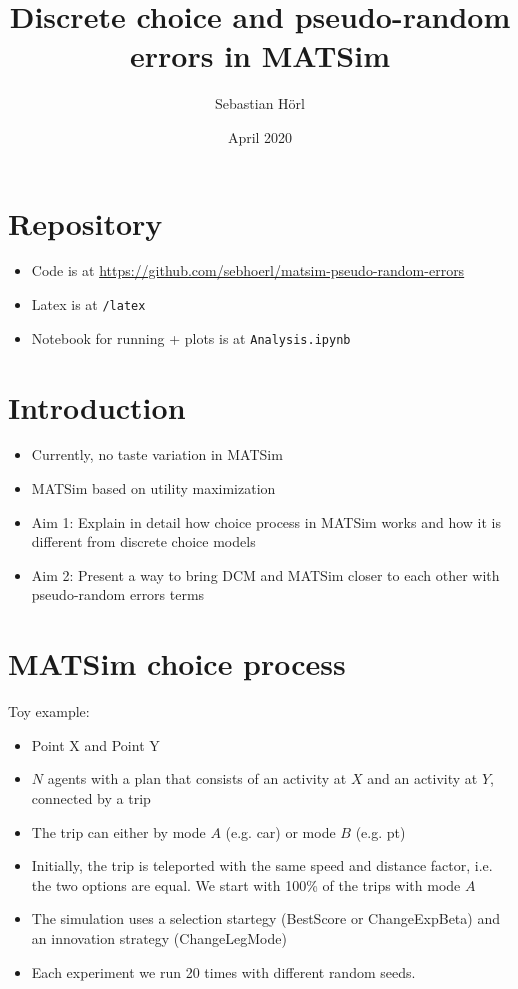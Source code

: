 \documentclass[a4paper]{article}
\title{Discrete choice and pseudo-random errors in MATSim}
\author{Sebastian Hörl}
\date{April 2020}
\begin{document}
\maketitle

\section*{Repository}

\begin{itemize}
  \item Code is at \url{https://github.com/sebhoerl/matsim-pseudo-random-errors}
  \item Latex is at \texttt{/latex}
  \item Notebook for running + plots is at \texttt{Analysis.ipynb}
\end{itemize}

\section{Introduction}

\begin{itemize}
    \item Currently, no taste variation in MATSim
    \item MATSim based on utility maximization
    \item Aim 1: Explain in detail how choice process in MATSim works and how it is different from discrete choice models
    \item Aim 2: Present a way to bring DCM and MATSim closer to each other with pseudo-random errors terms
\end{itemize}

\section{MATSim choice process}

Toy example:

\begin{itemize}
    \item Point X and Point Y
    \item $N$ agents with a plan that consists of an activity at $X$ and an activity at $Y$, connected by a trip
    \item The trip can either by mode $A$ (e.g. car) or mode $B$ (e.g. pt)
    \item Initially, the trip is teleported with the same speed and distance factor, i.e. the two options are equal.
    We start with 100\% of the trips with mode $A$
    \item The simulation uses a selection startegy (BestScore or ChangeExpBeta) and an innovation strategy (ChangeLegMode)
    \item Each experiment we run 20 times with different random seeds.
\end{itemize}
\end{document}
